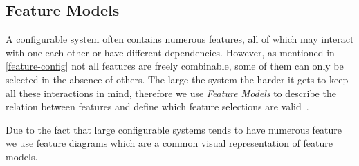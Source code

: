 \subsection{Feature Models}\label{ch:Feature-Model}

A configurable system often contains numerous features, all of which may interact with one each other or have different dependencies.
However, as mentioned in \autoref{feature-config} not all features are freely combinable, some of them can only be selected in the
absence of others. The large the system the harder it gets to keep all these interactions in mind, therefore we use \emph{Feature Models}
to describe the relation between features and define which feature selections are valid~\cite{Feature-Oriented-Software-Product-Lines}.

Due to the fact that large configurable systems tends to have numerous feature we use feature diagrams which are a common
visual representation of feature models.